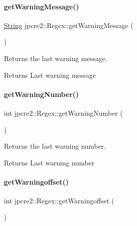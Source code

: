 \paragraph{\texorpdfstring{get\+Warning\+Message()}{getWarningMessage()}}
{\footnotesize\ttfamily \hyperlink{namespacejpcre2_a91f03070152fb228bc116c5a737f1d16}{String} jpcre2\+::\+Regex\+::get\+Warning\+Message (\begin{DoxyParamCaption}{ }\end{DoxyParamCaption})\hspace{0.3cm}{\ttfamily [inline]}}



Returns the last warning message. 

\begin{DoxyReturn}{Returns}
Last warning message 
\end{DoxyReturn}
\hypertarget{classjpcre2_1_1Regex_a6aa5722e52a154a1594ee6ea46e5d888_a6aa5722e52a154a1594ee6ea46e5d888}{}\label{classjpcre2_1_1Regex_a6aa5722e52a154a1594ee6ea46e5d888_a6aa5722e52a154a1594ee6ea46e5d888} 
\paragraph{\texorpdfstring{get\+Warning\+Number()}{getWarningNumber()}}
{\footnotesize\ttfamily int jpcre2\+::\+Regex\+::get\+Warning\+Number (\begin{DoxyParamCaption}{ }\end{DoxyParamCaption})\hspace{0.3cm}{\ttfamily [inline]}}



Returns the last warning number. 

\begin{DoxyReturn}{Returns}
Last warning number 
\end{DoxyReturn}
\hypertarget{classjpcre2_1_1Regex_a18dddb3eeedf5c61e0169770ffc9ab8f_a18dddb3eeedf5c61e0169770ffc9ab8f}{}\label{classjpcre2_1_1Regex_a18dddb3eeedf5c61e0169770ffc9ab8f_a18dddb3eeedf5c61e0169770ffc9ab8f} 
\paragraph{\texorpdfstring{get\+Warningoffset()}{getWarningoffset()}}
{\footnotesize\ttfamily int jpcre2\+::\+Regex\+::get\+Warningoffset (\begin{DoxyParamCaption}{ }\end{DoxyParamCaption})\hspace{0.3cm}{\ttfamily [inline]}}



